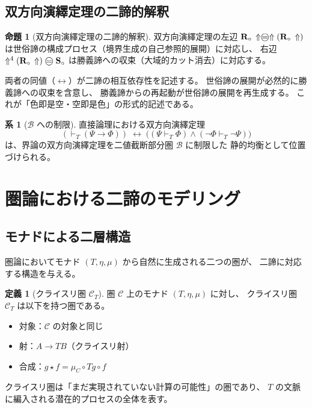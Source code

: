 \documentclass[11pt,a4paper]{ltjsarticle}
\theoremstyle{definition}
\newtheorem{definition}{定義}[section]
\newtheorem{proposition}{命題}[section]
\newtheorem{corollary}{系}[section]
\begin{document}
\subsection{双方向演繹定理の二諦的解釈}

\begin{proposition}[双方向演繹定理の二諦的解釈]
双方向演繹定理の左辺
$\Rmw\,\metanegation \mweq \metanegation(\Rmw\,\metanegation)$
は世俗諦の構成プロセス（境界生成の自己参照的展開）に対応し、
右辺 $\metanegation^4(\Rmw\,\metanegation) \mweq \Svoid$
は勝義諦への収束（大域的カット消去）に対応する。

両者の同値（$\leftrightarrow$）が二諦の相互依存性を記述する。
世俗諦の展開が必然的に勝義諦への収束を含意し、
勝義諦からの再起動が世俗諦の展開を再生成する。
これが「色即是空・空即是色」の形式的記述である。
\end{proposition}

\begin{corollary}[$\mathcal{B}$ への制限]
直接論理\cite{Hewitt2015}における双方向演繹定理
\[
(\vdash_T (\Psi \to \Phi))
\;\leftrightarrow\;
\bigl((\Psi \vdash_T \Phi) \land (\neg\Phi \vdash_T \neg\Psi)\bigr)
\]
は、界論の双方向演繹定理を二値截断部分圏 $\mathcal{B}$ に制限した
静的均衡として位置づけられる。
\end{corollary}

\section{圏論における二諦のモデリング}

\subsection{モナドによる二層構造}

圏論においてモナド $(T, \eta, \mu)$ から自然に生成される二つの圏が、
二諦に対応する構造を与える。

\begin{definition}[クライスリ圏 $\mathcal{C}_T$]
圏 $\mathcal{C}$ 上のモナド $(T, \eta, \mu)$ に対し、
クライスリ圏 $\mathcal{C}_T$ は以下を持つ圏である。
\begin{itemize}
  \item 対象：$\mathcal{C}$ の対象と同じ
  \item 射：$A \to TB$（クライスリ射）
  \item 合成：$g \star f = \mu_C \circ Tg \circ f$
\end{itemize}
クライスリ圏は「まだ実現されていない計算の可能性」の圏であり、
$T$ の文脈に編入される潜在的プロセスの全体を表す。
\end{definition}
\end{document}
